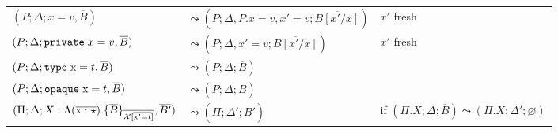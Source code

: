 \documentclass[12pt]{article}
\newcommand{\tx}{\text{\rm x}}
\newcommand{\BX}{\ensuremath{\mathcal{X}}}
\newcommand{\emptyenv}{\varnothing}
\newcommand{\private}{\texttt{private\;}}
\newcommand{\type}{\texttt{type\;}}
\newcommand{\opaque}{\texttt{opaque\;}}
\begin{document}
\begin{center}
    \begin{tabular}{lll}
        $(P; \Delta; x = v, \overline{B})$                                                                                            & $\leadsto (P; \Delta, P.x = v, x' = v; \overline{B[x'/x]})$ & $x'$ fresh                                                              \\
        $(P; \Delta; \private x = v, \overline{B})$                                                                                   & $\leadsto (P; \Delta, x' = v; \overline{B[x'/x]})$          & $x'$ fresh                                                              \\
        $(P; \Delta; \type \tx = t, \overline{B})$                                                                                    & $\leadsto (P; \Delta; \overline{B})$                                                                                                  \\
        $(P; \Delta; \opaque \tx = t, \overline{B})$                                                                                  & $\leadsto (P; \Delta; \overline{B})$                                                                                                  \\
        $(\Pi; \Delta; X : \Lambda (\overline{\tx : \star}). \{\overline{B}\}_{\overline{\BX[\overline{\tx'  = t}]}}, \overline{B'})$ & $\leadsto (\Pi; \Delta'; \overline{B'})$                    & if $(\Pi.X; \Delta; \overline{B}) \leadsto (\Pi.X; \Delta'; \emptyenv)$
    \end{tabular}
\end{center}







\end{document}
